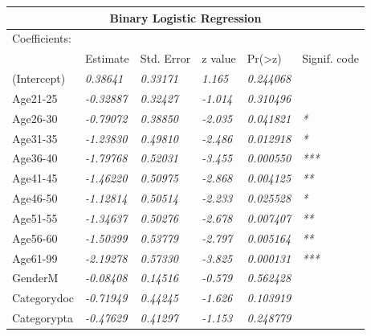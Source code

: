\documentclass[a4paper]{article}
\begin{document}
\begingroup
\renewcommand{\arraystretch}{1.35}
\begin{table}[ht]
\begin{center}
    \begin{tabular}{ | l | l | l | l | l | l | }
    \hline
    \multicolumn{6}{|c|}{\textbf{Binary Logistic Regression}} \\ \hline
    
    \multicolumn{1}{|l|}{Coefficients:} & \multicolumn{5}{|l|}{} \\ \hline
    
    & Estimate & Std. Error & z value & Pr(\textgreater z) & Signif. code \\ \hline
    
    (Intercept) & \textit{0.38641} & \textit{0.33171} & \textit{1.165} & \textit{0.244068} & \textit{} \\ \hline
    
    Age21-25 & \textit{-0.32887} & \textit{0.32427} & \textit{-1.014} & \textit{0.310496} & \textit{} \\ \hline
    Age26-30 & \textit{-0.79072} & \textit{0.38850} & \textit{-2.035} & \textit{0.041821} & \textit{*} \\ \hline
    Age31-35 & \textit{-1.23830} & \textit{0.49810} & \textit{-2.486} & \textit{0.012918} & \textit{*} \\ \hline
    Age36-40 & \textit{-1.79768} & \textit{0.52031} & \textit{-3.455} & \textit{0.000550} & \textit{***} \\ \hline
    Age41-45 & \textit{-1.46220} & \textit{0.50975} & \textit{-2.868} & \textit{0.004125} & \textit{**} \\ \hline
    Age46-50 & \textit{-1.12814} & \textit{0.50514} & \textit{-2.233} & \textit{0.025528} & \textit{*} \\ \hline
    Age51-55 & \textit{-1.34637} & \textit{0.50276} & \textit{-2.678} & \textit{0.007407} & \textit{**} \\ \hline
    Age56-60 & \textit{-1.50399} & \textit{0.53779} & \textit{-2.797} & \textit{0.005164} & \textit{**} \\ \hline
    Age61-99 & \textit{-2.19278} & \textit{0.57330} & \textit{-3.825} & \textit{0.000131} & \textit{***} \\ \hline
    
    GenderM & \textit{-0.08408} & \textit{0.14516} & \textit{-0.579} & \textit{0.562428} & \textit{}\\ \hline
    
    Categorydoc & \textit{-0.71949} & \textit{0.44245} & \textit{-1.626} & \textit{0.103919} & \textit{} \\ \hline
    Categorypta & \textit{-0.47629} & \textit{0.41297} & \textit{-1.153} & \textit{0.248779} & \textit{} \\ \hline
    

\end{tabular}
\end{center}
\end{table}
\end{document}
